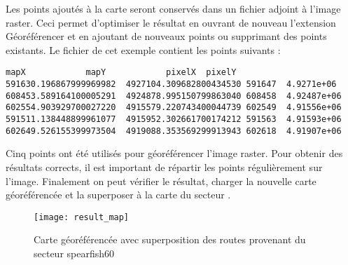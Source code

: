 
Les points ajoutés à la carte seront conservés dans un fichier  adjoint à l'image raster.
Ceci permet d'optimiser le résultat en ouvrant de nouveau l'extension Géoréférencer et en ajoutant de nouveaux points ou supprimant des points existants.
Le fichier  de cet exemple contient les points suivants :

\begin{verbatim}
mapX    		mapY    		pixelX  pixelY
591630.196867999969982  4927104.309682800434530 591647  4.9271e+06
608453.589164100005291  4924878.995150799863040 608458  4.92487e+06
602554.903929700027220  4915579.220743400044739 602549  4.91556e+06
591511.138448899961077  4915952.302661700174212 591563  4.91593e+06
602649.526155399973504  4919088.353569299913943 602618  4.91907e+06
\end{verbatim} 


Cinq points ont été utilisés pour géoréférencer l'image raster.
Pour obtenir des résultats corrects, il est important de répartir les points régulièrement sur l'image.
Finalement on peut vérifier le résultat, charger la nouvelle carte géoréférencée  et la superposer à la carte  du secteur .


\begin{figure}[ht]
\begin{center}
  \caption{Carte géoréférencée avec superposition des routes provenant du secteur spearfish60
  \nixcaption}\label{fig:result_map}\smallskip
  \texttt{[image: result\_map]}
\end{center}
\end{figure}
